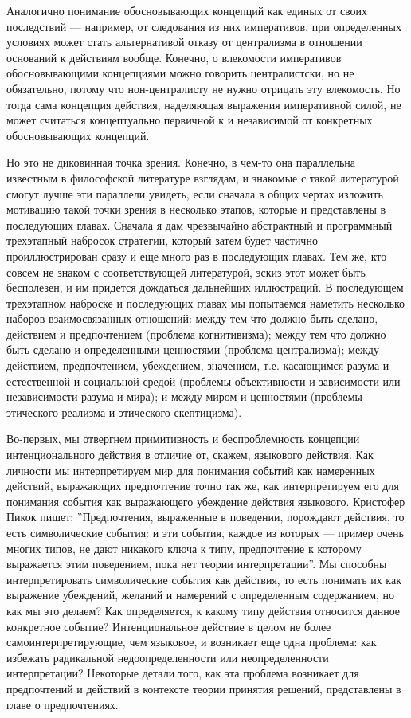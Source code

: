 \documentclass[11pt]{book}
\begin{document}
Аналогично понимание обосновывающих концепций как единых от своих последствий --- например, от следования из них императивов, при определенных условиях может стать альтернативой отказу от централизма в отношении оснований к действиям вообще. Конечно, о влекомости императивов обосновывающими концепциями можно говорить централистски, но не обязательно, потому что нон-централисту не нужно отрицать эту влекомость. Но тогда сама концепция действия, наделяющая выражения императивной силой, не может считаться концептуально первичной к и независимой от конкретных обосновывающих концепций.

Но это не диковинная точка зрения. Конечно, в чем-то она параллельна известным в философской литературе взглядам, и знакомые с такой литературой смогут лучше эти параллели увидеть, если сначала в общих чертах изложить мотивацию такой точки зрения в несколько этапов, которые и представлены в последующих главах. Сначала я дам чрезвычайно абстрактный и программный трехэтапный набросок стратегии, который затем будет частично проиллюстрирован сразу и еще много раз в последующих главах. Тем же, кто совсем не знаком с соответствующей литературой, эскиз этот может быть бесполезен, и им придется дождаться дальнейших иллюстраций. В последующем трехэтапном наброске и последующих главах мы попытаемся наметить несколько наборов взаимосвязанных отношений: между тем что должно быть сделано, действием и предпочтением (проблема когнитивизма); между тем что должно быть сделано и определенными ценностями (проблема централизма); между действием, предпочтением, убеждением, значением, т.е. касающимся разума и естественной и социальной средой (проблемы объективности и зависимости или независимости разума и мира); и между миром и ценностями (проблемы этического реализма и этического скептицизма).

Во-первых, мы отвергнем примитивность и беспроблемность концепции интенционального действия в отличие от, скажем, языкового действия. Как личности мы интерпретируем мир для понимания событий как намеренных действий, выражающих предпочтение точно так же, как интерпретируем его для понимания события как выражающего убеждение действия языкового. Кристофер Пикок пишет: ''Предпочтения, выраженные в поведении, порождают действия, то есть символические события: и эти события, каждое из которых --- пример очень многих типов, не дают никакого ключа к типу, предпочтение к которому выражается этим поведением, пока нет теории интерпретации''. Мы способны интерпретировать символические события как действия, то есть понимать их как выражение убеждений, желаний и намерений с определенным содержанием, но как мы это делаем? Как определяется, к какому типу действия относится данное конкретное событие? Интенциональное действие в целом не более самоинтерпретирующие, чем языковое, и возникает еще одна проблема: как избежать радикальной недоопределенности или неопределенности интерпретации? Некоторые детали того, как эта проблема возникает для предпочтений и действий в контексте теории принятия решений, представлены в главе о предпочтениях.
\end{document}
